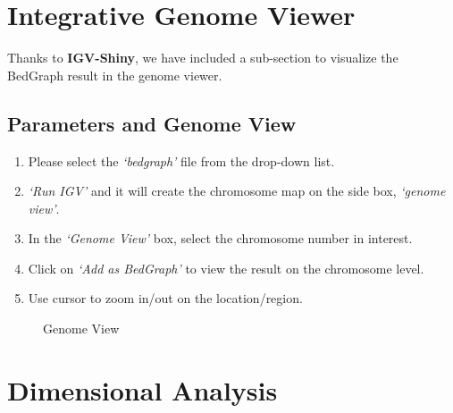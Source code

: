 \documentclass[
  a4paper,
  DIV=11,
  numbers=noendperiod,
  oneside,
  open=any]{scrreport}
\providecommand{\tightlist}{%
  \setlength{\itemsep}{0pt}\setlength{\parskip}{0pt}}\usepackage{longtable,booktabs,array}
\begin{document}
\chapter{Integrative Genome Viewer}\label{integrative-genome-viewer}

Thanks to \textbf{IGV-Shiny}, we have included a sub-section to
visualize the BedGraph result in the genome viewer.

\section{Parameters and Genome View}\label{parameters-and-genome-view}

\begin{enumerate}
\def\labelenumi{\arabic{enumi}.}
\tightlist
\item
  Please select the \emph{`bedgraph'} file from the drop-down list.
\item
  \emph{`Run IGV'} and it will create the chromosome map on the side
  box, \emph{`genome view'}.
\item
  In the \emph{`Genome View'} box, select the chromosome number in
  interest.
\item
  Click on \emph{`Add as BedGraph'} to view the result on the chromosome
  level.
\item
  Use cursor to zoom in/out on the location/region.
\end{enumerate}

\begin{figure}[H]


\caption{\label{fig-igv1}Genome View}

\end{figure}%

\chapter{Dimensional Analysis}\label{sec-multid}
\end{document}
